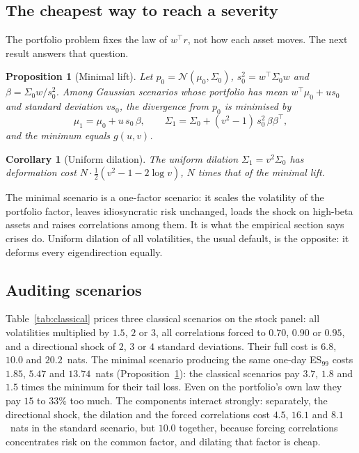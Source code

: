 \documentclass[12pt]{article}
\newtheorem{proposition}{Proposition}
\newtheorem{corollary}{Corollary}
\theoremstyle{definition}
\theoremstyle{remark}
\begin{document}
\begin{doublespace}
\subsection{The cheapest way to reach a severity}

The portfolio problem fixes the law of $w^\top r$, not how each asset moves.
The next result answers that question.

\begin{proposition}[Minimal lift]
\label{prop:lift}
Let $p_0=\mathcal N(\mu_0,\Sigma_0)$, $s_0^2=w^\top\Sigma_0w$ and
$\beta=\Sigma_0w/s_0^2$. Among Gaussian scenarios whose portfolio has mean
$w^\top\mu_0+us_0$ and standard deviation $vs_0$, the divergence from $p_0$ is
minimised by
\begin{equation}
\label{eq:lift}
\mu_1=\mu_0+u\,s_0\,\beta,\qquad\Sigma_1=\Sigma_0+(v^2-1)\,s_0^2\,\beta\beta^\top,
\end{equation}
and the minimum equals $g(u,v)$.
\end{proposition}

\begin{corollary}[Uniform dilation]
\label{cor:uniform}
The uniform dilation $\Sigma_1=v^2\Sigma_0$ has deformation cost
$N\cdot\tfrac12(v^2-1-2\log v)$, $N$ times that of the minimal lift.
\end{corollary}

The minimal scenario is a one-factor scenario: it scales the volatility of the
portfolio factor, leaves idiosyncratic risk unchanged, loads the shock on
high-beta assets and raises correlations among them. It is what the
empirical section says crises do. Uniform dilation of all volatilities, the
usual default, is the opposite: it deforms every eigendirection equally.

\subsection{Auditing scenarios}

Table~\ref{tab:classical} prices three classical scenarios on the stock panel:
all volatilities multiplied by $1.5$, $2$ or $3$, all correlations forced to
$0.70$, $0.90$ or $0.95$, and a directional shock of $2$, $3$ or $4$ standard
deviations. Their full cost is $6.8$, $10.0$ and $20.2$~nats. The minimal
scenario producing the same one-day ES$_{99}$ costs $1.85$, $5.47$ and
$13.74$~nats (Proposition~\ref{prop:lift}): the classical scenarios pay
$3.7$, $1.8$ and $1.5$ times the minimum for their tail loss. Even on the
portfolio's own law they pay $15$ to $33\%$ too much. The components interact
strongly: separately, the directional shock, the dilation and the forced
correlations cost $4.5$, $16.1$ and $8.1$~nats in the standard scenario, but
$10.0$ together, because forcing correlations concentrates risk on the common
factor, and dilating that factor is cheap.


\end{doublespace}
\end{document}
